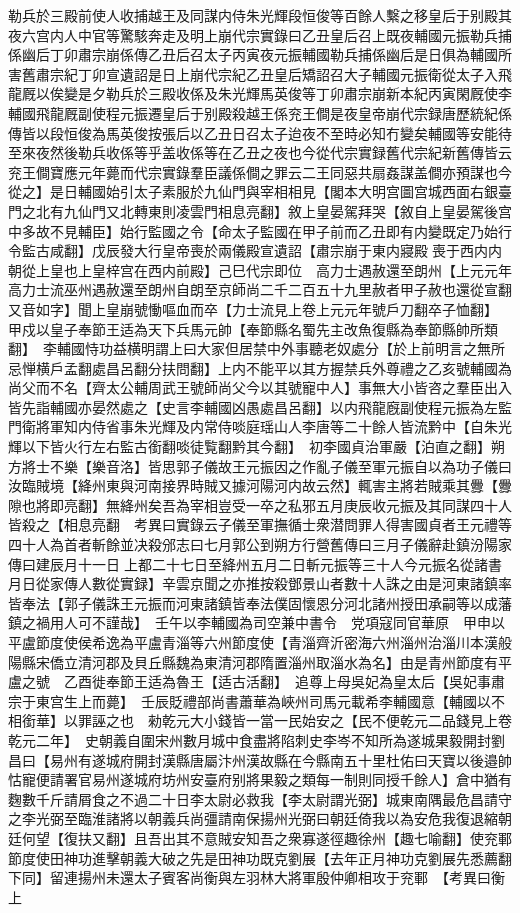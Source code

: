 勒兵於三殿前使人收捕越王及同謀内侍朱光輝段恒俊等百餘人繫之移皇后于别殿其夜六宫内人中官等驚駭奔走及明上崩代宗實錄曰乙丑皇后召上既夜輔國元振勒兵捕係幽后丁卯肅宗崩係傳乙丑后召太子丙寅夜元振輔國勒兵捕係幽后是日俱為輔國所害舊肅宗紀丁卯宣遺詔是日上崩代宗紀乙丑皇后矯詔召大子輔國元振衛從太子入飛龍厩以俟變是夕勒兵於三殿收係及朱光輝馬英俊等丁卯肅宗崩新本紀丙寅閑厩使李輔國飛龍厩副使程元振遷皇后于别殿殺越王係兖王僴是夜皇帝崩代宗録唐歷統紀係傳皆以段恒俊為馬英俊按張后以乙丑日召太子迨夜不至時必知冇變矣輔國等安能待至來夜然後勒兵收係等乎盖收係等在乙丑之夜也今從代宗實録舊代宗紀新舊傳皆云兖王僴寶應元年薨而代宗實錄羣臣議係僴之罪云二王同惡共扇姦謀盖僴亦預謀也今從之】是日輔國始引太子素服於九仙門與宰相相見【閣本大明宫圖宫城西面右銀臺門之北有九仙門又北轉東則凌雲門相息亮翻】敘上皇晏駕拜哭【敘自上皇晏駕後宫中多故不見輔臣】始行監國之令【命太子監國在甲子前而乙丑即有内變既定乃始行令監古咸翻】戊辰發大行皇帝喪於兩儀殿宣遺詔【肅宗崩于東内寢殿喪于西内内朝從上皇也上皇梓宫在西内前殿】己巳代宗即位　高力士遇赦還至朗州【上元元年高力士流巫州遇赦還至朗州自朗至京師尚二千二百五十九里赦者甲子赦也還從宣翻又音如字】聞上皇崩號慟嘔血而卒【力士流見上卷上元元年號戶刀翻卒子恤翻】　甲戍以皇子奉節王适為天下兵馬元帥【奉節縣名蜀先主改魚復縣為奉節縣帥所類翻】　李輔國恃功益横明謂上曰大家但居禁中外事聽老奴處分【於上前明言之無所忌惮横戶孟翻處昌呂翻分扶問翻】上内不能平以其方握禁兵外尊禮之乙亥號輔國為尚父而不名【齊太公輔周武王號師尚父今以其號寵中人】事無大小皆咨之羣臣出入皆先詣輔國亦晏然處之【史言李輔國凶愚處昌呂翻】以内飛龍廐副使程元振為左監門衛將軍知内侍省事朱光輝及内常侍啖庭瑶山人李唐等二十餘人皆流黔中【自朱光輝以下皆火行左右監古銜翻啖徒覧翻黔其今翻】　初李國貞治軍嚴【泊直之翻】朔方將士不樂【樂音洛】皆思郭子儀故王元振因之作亂子儀至軍元振自以為功子儀曰汝臨賊境【絳州東與河南接界時賊又據河陽河内故云然】輒害主將若賊乘其釁【釁隙也將即亮翻】無絳州矣吾為宰相豈受一卒之私邪五月庚辰收元振及其同謀四十人皆殺之【相息亮翻　考異曰實錄云子儀至軍撫循士衆潜問罪人得害國貞者王元禮等四十人為首者斬餘並决殺邠志曰七月郭公到朔方行營舊傳曰三月子儀辭赴鎮汾陽家傳曰建辰月十一日上都二十七日至絳州五月二日斬元振等三十人今元振名從諸書月日從家傳人數從實録】辛雲京聞之亦推按殺鄧景山者數十人誅之由是河東諸鎮率皆奉法【郭子儀誅王元振而河東諸鎮皆奉法僕固懷恩分河北諸州授田承嗣等以成藩鎮之禍用人可不謹哉】　壬午以李輔國為司空兼中書令　党項寇同官華原　甲申以平盧節度使侯希逸為平盧青淄等六州節度使【青淄齊沂密海六州淄州治淄川本漢般陽縣宋僑立清河郡及貝丘縣魏為東清河郡隋置淄州取淄水為名】由是青州節度有平盧之號　乙酉徙奉節王适為魯王【适古活翻】　追尊上母吳妃為皇太后【吳妃事肅宗于東宫生上而薨】　壬辰貶禮部尚書蕭華為峽州司馬元載希李輔國意【輔國以不相銜華】以罪誣之也　勑乾元大小錢皆一當一民始安之【民不便乾元二品錢見上卷乾元二年】　史朝義自圍宋州數月城中食盡將陷刺史李岑不知所為遂城果毅開封劉昌曰【易州有遂城府開封漢縣唐屬汴州漢故縣在今縣南五十里杜佑曰天寶以後邉帥怙寵便請署官易州遂城府坊州安臺府别將果毅之類每一制則同授千餘人】倉中猶有麴數千斤請屑食之不過二十日李太尉必救我【李太尉謂光弼】城東南隅最危昌請守之李光弼至臨淮諸將以朝義兵尚彊請南保揚州光弼曰朝廷倚我以為安危我復退縮朝廷何望【復扶又翻】且吾出其不意賊安知吾之衆寡遂徑趣徐州【趣七喻翻】使兖鄆節度使田神功進擊朝義大破之先是田神功既克劉展【去年正月神功克劉展先悉薦翻下同】留連揚州未還太子賓客尚衡與左羽林大將軍殷仲卿相攻于兖鄆　【考異曰衡上